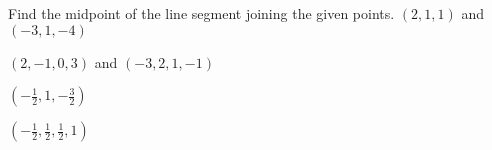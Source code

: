 

\begin{Exercise}[
name={},
title={}, 
difficulty=0,
origin={\cite{SM}}]
Find the midpoint of the line segment joining the given points.
\Question $(2,1,1)$ and $(-3,1,-4)$

\Question $(2,-1,0,3)$ and $(-3,2,1,-1)$
\end{Exercise}

\begin{Answer}
\Question $\left(-\frac{1}{2},1,-\frac{3}{2}\right)$

\Question $\left(-\frac{1}{2},\frac{1}{2},\frac{1}{2},1\right)$
\end{Answer}
